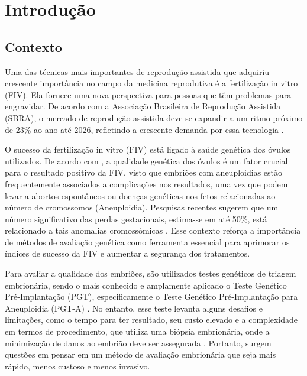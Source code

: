 \chapter[Introdução]{Introdução}

\section{Contexto}

Uma das técnicas mais importantes de reprodução assistida que adquiriu crescente importância no campo da medicina reprodutiva é a fertilização in vitro (FIV). Ela fornece uma nova perspectiva para pessoas que têm problemas para engravidar. De acordo com a Associação Brasileira de Reprodução Assistida (SBRA), o mercado de reprodução assistida deve se expandir a um ritmo próximo de 23\% ao ano até 2026, refletindo a crescente demanda por essa tecnologia .

O sucesso da fertilização in vitro (FIV) está ligado à saúde genética dos óvulos utilizados. De acordo com , a qualidade genética dos óvulos é um fator crucial para o resultado positivo da FIV, visto que embriões com aneuploidias estão frequentemente associados a complicações nos resultados, uma vez que podem levar a abortos espontâneos ou doenças genéticas nos fetos relacionadas ao número de cromossomos (Aneuploidia). Pesquisas recentes sugerem que um número significativo das perdas gestacionais, estima-se em até 50\%, está relacionado a tais anomalias cromossômicas \cite{scienceofbiogenetics2024}. Esse contexto reforça a importância de métodos de avaliação genética como ferramenta essencial para aprimorar os índices de sucesso da FIV e aumentar a segurança dos tratamentos.

Para avaliar a qualidade dos embriões, são utilizados testes genéticos de triagem embrionária, sendo o mais conhecido e amplamente aplicado o Teste Genético Pré-Implantação (PGT), especificamente o Teste Genético Pré-Implantação para Aneuploidia (PGT-A) \cite{yang2024}. No entanto, esse teste levanta alguns desafios e limitações, como o tempo para ter resultado, seu custo elevado e a complexidade em termos de procedimento, que utiliza uma biópsia embrionária, onde a minimização de danos ao embrião deve ser assegurada \cite{yang2024}. Portanto, surgem questões em pensar em um método de avaliação embrionária que seja mais rápido,  menos custoso e menos invasivo. 

